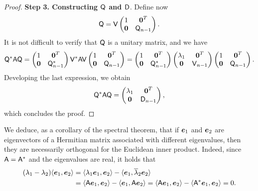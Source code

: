\begin{proof}
        \vspace{.3cm}
        \textbf{Step 3. Constructing $\mathsf Q$ and $\mathsf D$}.
        Define now
        \[
            \mathsf Q =
            \mathsf V
            \begin{pmatrix}
                1 & \mathbf{\boldsymbol{0}}^T \\
                \mathbf{\boldsymbol{0}} & \mathsf Q_{n-1}
            \end{pmatrix}.
        \]
        It is not difficult to verify that $\mathsf Q$ is a unitary matrix,
        and we have
        \[
            \mathsf Q^* \mathsf A \mathsf Q =
            \begin{pmatrix}
                1 & \mathbf{\boldsymbol{0}}^T \\
                \mathbf{\boldsymbol{0}} & \mathsf Q_{n-1}^*
            \end{pmatrix}
            \mathsf V^* \mathsf A \mathsf V
            \begin{pmatrix}
                1 & \mathbf{\boldsymbol{0}}^T \\
                \mathbf{\boldsymbol{0}} & \mathsf Q_{n-1}
            \end{pmatrix}
            =
            \begin{pmatrix}
                1 & \mathbf{\boldsymbol{0}}^T \\
                \mathbf{\boldsymbol{0}} & \mathsf Q_{n-1}^*
            \end{pmatrix}
            \begin{pmatrix}
                \lambda_1 & \mathbf{\boldsymbol{0}}^T \\
                \mathbf{\boldsymbol{0}} & \mathsf V_{n-1}
            \end{pmatrix}
            \begin{pmatrix}
                1 & \mathbf{\boldsymbol{0}}^T \\
                \mathbf{\boldsymbol{0}} & \mathsf Q_{n-1}
            \end{pmatrix}.
        \]
        Developing the last expression, we obtain
        \[
            \mathsf Q^* \mathsf A \mathsf Q
            =
            \begin{pmatrix}
                \lambda_1 & \mathbf{\boldsymbol{0}}^T \\
                \mathbf{\boldsymbol{0}} & \mathsf D_{n-1}
            \end{pmatrix},
        \]
        which concludes the proof.
\end{proof}

We deduce, as a corollary of the spectral theorem,
that if $\mathbf{\boldsymbol{e}}_1$ and $\mathbf{\boldsymbol{e}}_2$ are eigenvectors of a Hermitian matrix associated with different eigenvalues,
then they are necessarily orthogonal for the Euclidean inner product.
Indeed, since $\mathsf A = \mathsf A^*$ and the eigenvalues are real, it holds that
\begin{align*}
    (\lambda_1 - \lambda_2) \langle\mathbf{\boldsymbol{e}}_1, \mathbf{\boldsymbol{e}}_2\rangle
    &= \langle\lambda_1 \mathbf{\boldsymbol{e}}_1, \mathbf{\boldsymbol{e}}_2\rangle - \langle\mathbf{\boldsymbol{e}}_1, \overline \lambda_2 \mathbf{\boldsymbol{e}}_2\rangle \\
    &= \langle\mathsf A \mathbf{\boldsymbol{e}}_1, \mathbf{\boldsymbol{e}}_2\rangle - \langle\mathbf{\boldsymbol{e}}_1, \mathsf A \mathbf{\boldsymbol{e}}_2\rangle
    = \langle\mathsf A \mathbf{\boldsymbol{e}}_1, \mathbf{\boldsymbol{e}}_2\rangle - \langle\mathsf A^* \mathbf{\boldsymbol{e}}_1, \mathbf{\boldsymbol{e}}_2\rangle = 0.
\end{align*}

